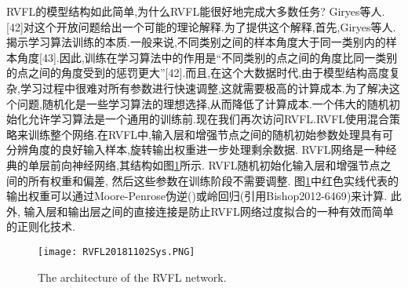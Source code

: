 {%
RVFL的模型结构如此简单,为什么RVFL能很好地完成大多数任务? Giryes等人.[42]对这个开放问题给出一个可能的理论解释.为了提供这个解释,首先,Giryes等人.揭示学习算法训练的本质.一般来说,不同类别之间的样本角度大于同一类别内的样本角度[43].因此,训练在学习算法中的作用是“不同类别的点之间的角度比同一类别的点之间的角度受到的惩罚更大”[42].而且,在这个大数据时代,由于模型结构高度复杂,学习过程中很难对所有参数进行快速调整,这就需要极高的计算成本.为了解决这个问题,随机化是一些学习算法的理想选择,从而降低了计算成本.一个伟大的随机初始化允许学习算法是一个通用的训练前.现在我们再次访问RVFL.RVFL使用混合策略来训练整个网络.在RVFL中,输入层和增强节点之间的随机初始参数处理具有可分辨角度的良好输入样本,旋转输出权重进一步处理剩余数据.
RVFL网络是一种经典的单层前向神经网络,其结构如图\ref{RVFLNN181102Sys}所示. RVFL随机初始化输入层和增强节点之间的所有权重和偏差, 然后这些参数在训练阶段不需要调整.
图\ref{RVFLNN181102Sys}中红色实线代表的输出权重可以通过Moore-Penrose伪逆(\cite{paopillips1995-6471,IgelnikPao1995-6470})或岭回归(引用{Bishop2012-6469})来计算.
此外, 输入层和输出层之间的直接连接是防止RVFL网络过度拟合的一种有效而简单的正则化技术.
\begin{figure}[tb]
\centering
  \texttt{[image: RVFL20181102Sys.PNG]}
  \caption{The architecture of the RVFL network.}
  \label{RVFLNN181102Sys}
\end{figure}

}
